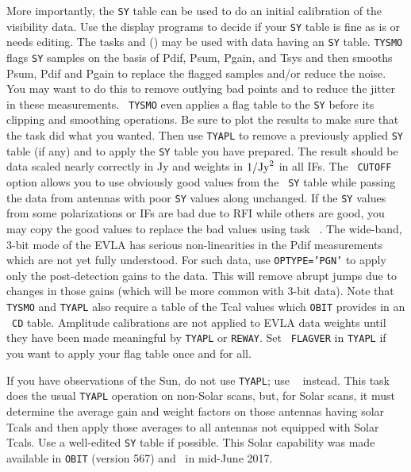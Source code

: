 More importantly, the {\tt SY} table can be used to do an initial
calibration of the visibility data.  Use the display programs to
decide if your {\tt SY} table is fine as is or needs editing.  The
tasks {\tt {}} and  {\tt {}} () may be
used with  data having an {\tt SY} table.  {\tt TYSMO}
flags {\tt SY} samples on the basis of Pdif, Psum, Pgain, and Tsys and
then smooths Psum, Pdif and Pgain to replace the flagged samples
and/or reduce the noise.  You may want to do this to remove outlying
bad points and to reduce the jitter in these measurements.  {\tt
TYSMO} even applies a flag table to the {\tt SY} before its clipping
and smoothing operations.  Be sure to plot the results to make sure
that the task did what you wanted.  Then use {\tt TYAPL} to remove a
previously applied {\tt SY} table (if any) and to apply the {\tt SY}
table you have prepared.  The result should be data scaled nearly
correctly in Jy and weights in $1/{\rm Jy}^2$ in all IFs.  The {\tt
CUTOFF} option allows you to use obviously good values from the {\tt
SY} table while passing the data from antennas with poor {\tt SY}
values along unchanged.  If the {\tt SY} values from some
polarizations or IFs are bad due to RFI while others are good, you
may copy the good values to replace the bad values using task {\tt
{}}\@.  The wide-band, 3-bit mode of the EVLA has serious
non-linearities in the Pdif measurements which are not yet fully
understood.  For such data, use {\tt OPTYPE='PGN'} to apply only the
post-detection gains to the data.  This will remove abrupt jumps due
to changes in those gains (which will be more common with 3-bit data).
Note that {\tt TYSMO} and {\tt TYAPL} also require a table of the Tcal
values which {\tt OBIT} provides in an \AIPS\ {\tt CD} table.
Amplitude calibrations are not applied to EVLA data weights until they
have been made meaningful by {\tt TYAPL} or {\tt REWAY}\@.  Set {\tt
FLAGVER} in {\tt TYAPL} if you want to apply your flag table once and
for all.

If you have observations of the Sun, do not use {\tt TYAPL}; use {\tt
{}} instead.  This task does the usual {\tt TYAPL} operation
on non-Solar scans, but, for Solar scans, it must determine the
average gain and weight factors on those antennas having solar Tcals
and then apply those averages to all antennas not equipped with Solar
Tcals.  Use a well-edited {\tt SY} table if possible.  This Solar
capability was made available in {\tt OBIT} (version 567) and \AIPS\
in mid-June 2017.

